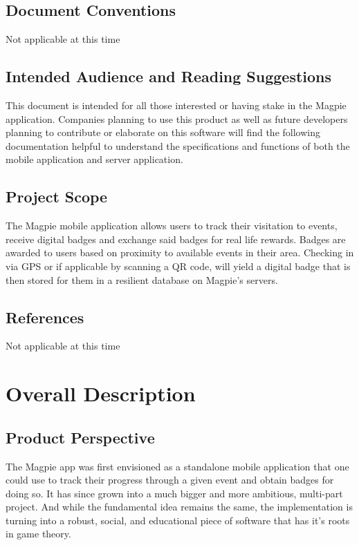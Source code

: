 \documentclass{scrreprt}
\begin{document}
\section{Document Conventions}
Not applicable at this time

\section{Intended Audience and Reading Suggestions}
This document is intended for all those interested or having stake in the Magpie
application.  Companies planning to use this product as well as future developers
planning to contribute or elaborate on this software will find the following documentation
helpful to understand the specifications and functions of both the mobile application and server application.

\section{Project Scope}
The Magpie mobile application allows users to track their visitation to events,
receive digital badges and exchange said badges for real life rewards. Badges are awarded
to users based on proximity to available events in their area.  Checking in via GPS or
if applicable by scanning a QR code, will yield a digital badge that is then stored for them
in a resilient database on Magpie's servers.

\section{References}
Not applicable at this time

\chapter{Overall Description}

\section{Product Perspective}
The Magpie app was first envisioned as a standalone mobile application that one
could use to track their progress through a given event and obtain badges for doing so.
It has since grown into a much bigger and more ambitious, multi-part project. And while the
fundamental idea remains the same, the implementation is turning into a robust, social, and
educational piece of software that has it's roots in game theory.
\end{document}
